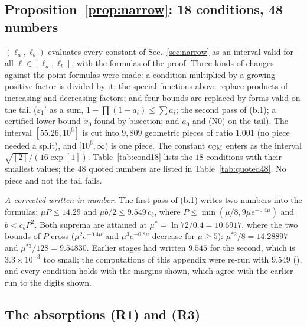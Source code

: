 \subsection{Proposition~\ref{prop:narrow}: 18 conditions, 48 numbers}

$(\ell_a,\ell_b)$ evaluates every constant of Sec.~\ref{sec:narrow} as an interval valid for all $\ell\in[\ell_a,\ell_b]$, with the formulas of the proof.
Three kinds of changes against the point formulas were made: a condition multiplied by a growing positive factor is divided by it; the special functions above replace products of increasing and decreasing factors; and four bounds are replaced by forms valid on the tail ($\varepsilon_1'$ as a sum, $1-\prod(1-a_i)\le\sum a_i$; the second pass of (b.1); a certified lower bound $x_0$ found by bisection; and $a_0$ and (N0) on the tail).
The interval $[55.26,10^6]$ is cut into $9{,}809$ geometric pieces of ratio $1.001$ (no piece needed a split), and $[10^6,\infty)$ is one piece.
The constant $c_{\rm CM}$ enters as the interval $\sqrt{[2]}/(16\exp[1])$.
Table~\ref{tab:cond18} lists the $18$ conditions with their smallest values; the $48$ quoted numbers are listed in Table~\ref{tab:quoted48}.
No piece and not the tail fails.



\emph{A corrected written-in number.}
The first pass of (b.1) writes two numbers into the formulas: $\mu P\le14.29$ and $\mu b/2\le9.549\,c_b$, where $P\le\min(\mu/8,9\mu e^{-0.4\mu})$ and $b<c_bP^2$.
Both suprema are attained at $\mu^*=\ln72/0.4=10.6917$, where the two bounds of $P$ cross ($\mu^2e^{-0.4\mu}$ and $\mu^3e^{-0.8\mu}$ decrease for $\mu\ge5$): $\mu^{*2}/8=14.28897$ and $\mu^{*3}/128=9.54830$.
Earlier stages had written $9.545$ for the second, which is $3.3\times10^{-3}$ too small; the computations of this appendix were re-run with $9.549$ (), and every condition holds with the margins shown, which agree with the earlier run to the digits shown.

\subsection{The absorptions (R1) and (R3)}

